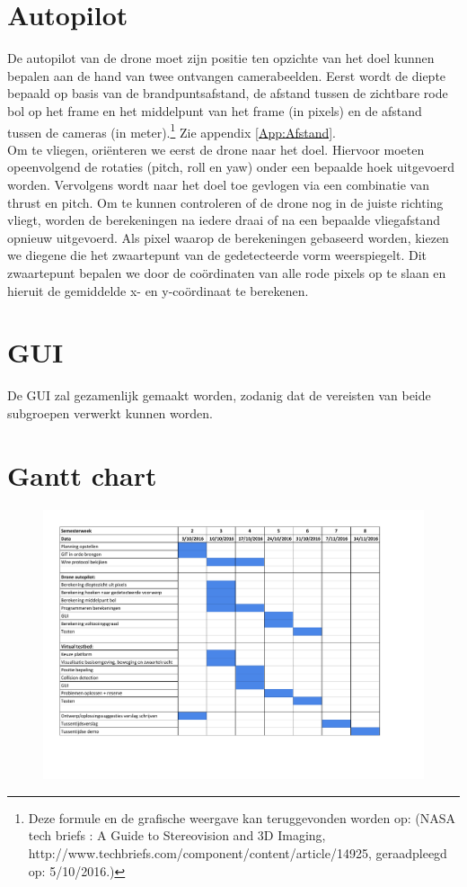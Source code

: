 \documentclass{peno-opdracht1}
\begin{document}
\section{Autopilot}
De autopilot van de drone moet zijn positie ten opzichte van het doel kunnen bepalen aan de hand van twee ontvangen camerabeelden. Eerst wordt de diepte bepaald op basis van de brandpuntsafstand, de afstand tussen de zichtbare rode bol op het frame en het middelpunt van het frame (in pixels) en de afstand tussen de camera\textquotesingle s (in meter).\footnote{Deze formule en de grafische weergave kan teruggevonden worden op: (NASA tech briefs : A Guide to Stereovision and 3D Imaging, http://www.techbriefs.com/component/content/article/14925, geraadpleegd op: 5/10/2016.)\label{refnote}} Zie appendix \ref{App:Afstand}. \\
Om te vliegen, ori\"enteren we eerst de drone naar het doel. Hiervoor moeten opeenvolgend de rotaties (pitch, roll en yaw) onder een bepaalde hoek uitgevoerd worden. Vervolgens wordt naar het doel toe gevlogen via een combinatie van thrust en pitch.
Om te kunnen controleren of de drone nog in de juiste richting vliegt, worden de berekeningen na iedere draai of na een bepaalde vliegafstand opnieuw uitgevoerd.
Als pixel waarop de berekeningen gebaseerd worden, kiezen we diegene die het zwaartepunt van de gedetecteerde vorm weerspiegelt. Dit zwaartepunt bepalen we door de co\"ordinaten van alle rode pixels op te slaan en hieruit de gemiddelde x- en y-co\"ordinaat te berekenen.

\section{GUI}
De GUI zal gezamenlijk gemaakt worden, zodanig dat de vereisten van beide subgroepen verwerkt kunnen worden. \\

\newpage
\appendix
\section{Gantt chart} \label{App:Planning}

\begin{figure}[h!]
	\begin{center}
		\includegraphics[scale=0.55]{Planning.pdf}
	\end{center}
\end{figure}
\end{document}
